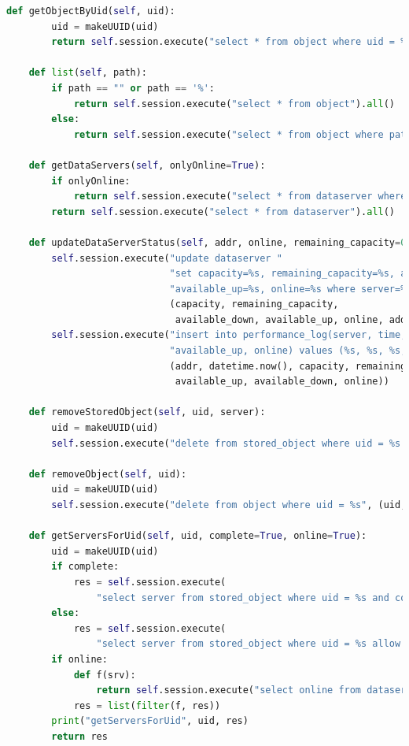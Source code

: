 \documentclass{article}
\begin{document}
\begin{lstlisting}[language=Python, title=Codice]
    def getObjectByUid(self, uid):
        uid = makeUUID(uid)
        return self.session.execute("select * from object where uid = %s", (uid, )).one()

    def list(self, path):
        if path == "" or path == '%':
            return self.session.execute("select * from object").all()
        else:
            return self.session.execute("select * from object where path like %s", (path, )).all()

    def getDataServers(self, onlyOnline=True):
        if onlyOnline:
            return self.session.execute("select * from dataserver where online=true allow filtering").all()
        return self.session.execute("select * from dataserver").all()

    def updateDataServerStatus(self, addr, online, remaining_capacity=0, capacity=0, available_down=.0, available_up=.0):
        self.session.execute("update dataserver "
                             "set capacity=%s, remaining_capacity=%s, available_down=%s, "
                             "available_up=%s, online=%s where server=%s",
                             (capacity, remaining_capacity,
                              available_down, available_up, online, addr))
        self.session.execute("insert into performance_log(server, time, capacity, remaining_capacity, available_down,"
                             "available_up, online) values (%s, %s, %s, %s, %s, %s, %s)",
                             (addr, datetime.now(), capacity, remaining_capacity,
                              available_up, available_down, online))

    def removeStoredObject(self, uid, server):
        uid = makeUUID(uid)
        self.session.execute("delete from stored_object where uid = %s and server = %s", (uid, server))

    def removeObject(self, uid):
        uid = makeUUID(uid)
        self.session.execute("delete from object where uid = %s", (uid, ))

    def getServersForUid(self, uid, complete=True, online=True):
        uid = makeUUID(uid)
        if complete:
            res = self.session.execute(
                "select server from stored_object where uid = %s and complete = true allow filtering", (uid, )).all()
        else:
            res = self.session.execute(
                "select server from stored_object where uid = %s allow filtering", (uid, )).all()
        if online:
            def f(srv):
                return self.session.execute("select online from dataserver where server = %s", (srv.server, )).one().online
            res = list(filter(f, res))
        print("getServersForUid", uid, res)
        return res


\end{lstlisting}
\end{document}
